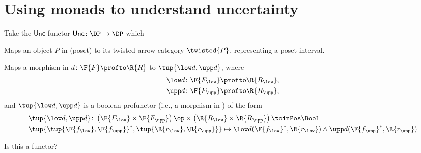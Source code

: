 \section{Using monads to understand uncertainty}

Take the $\mathsf{Unc}$ functor $\mathsf{Unc}\colon \DP\to \DP$ which
\begin{compactenum}
    \item Maps an object $P$ in \DP (poset) to its twisted arrow category $\twisted{P}$, representing a poset interval.
    \item Maps a morphism in \DP $d\colon \F{F}\profto \R{R}$ to $\tup{\low d,\upp d}$, where
    \begin{equation}
        \begin{aligned}
            \low d\colon \F{F_{\low}}&\profto \R{R_{\low}},\\
            \upp d\colon \F{F_{\upp}}&\profto \R{R_{\upp}},
        \end{aligned}
    \end{equation}
    and $\tup{\low d,\upp d}$ is a boolean profunctor (i.e., a morphism in \DP) of the form
    \begin{equation}
        \begin{aligned}
            &\tup{\low d,\upp d}\colon \left(\F{F_{\low}}\times \F{F_{\upp}} \right)\op \times \left(\R{R_{\low}}\times \R{R_{\upp}} \right)\toinPos \Bool\\
            &\tup{\tup{\F{f_{\low}},\F{f_{\upp}}}^*,\tup{\R{r_{\low}},\R{r_{\upp}}}}\mapsto \low d(\F{f_{\low}}^*,\R{r_{\low}})\wedge \upp d(\F{f_{\upp}}^*,\R{r_{\upp}})
        \end{aligned}
    \end{equation}
\end{compactenum}

Is this a functor?

